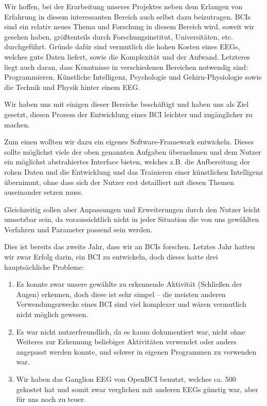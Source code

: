 \documentclass[10pt]{article}
\begin{document}
	
Wir hoffen, bei der Erarbeitung unseres Projektes neben dem Erlangen von Erfahrung in diesem interessanten Bereich auch selbst dazu beizutragen.
BCIs sind ein relativ neues Thema und Forschung in diesem Bereich wird, soweit wir gesehen haben, größtenteils durch Forschungsinstitut, Universitäten, etc. durchgeführt.
Gründe dafür sind vermutlich die hohen Kosten eines EEGs, welches gute Daten liefert, sowie die Komplexität und der Aufwand.
Letzteres liegt auch daran, dass Kenntnisse in verschiedenen Bereichen notwendig sind: Programmieren, Künstliche Intelligenz, Psychologie und Gehirn-Physiologie sowie die Technik und Physik hinter einem EEG.

Wir haben uns mit einigen dieser Bereiche beschäftigt und haben uns als Ziel gesetzt, diesen Prozess der Entwicklung eines BCI leichter und zugänglicher zu machen.

Zum einen wollten wir dazu ein eigenes Software-Framework entwickeln. 
Dieses sollte möglichst viele der oben genannten Aufgaben übernehmen und dem Nutzer ein möglichst abstrahiertes Interface bieten, welches z.B. die Aufbereitung der rohen Daten und die Entwicklung und das Trainieren einer künstlichen Intelligenz übernimmt, ohne dass sich der Nutzer erst detailliert mit diesen Themen auseinander setzen muss.

Gleichzeitig sollen aber Anpassungen und Erweiterungen durch den Nutzer leicht umsetzbar sein, da voraussichtlich nicht in jeder Situation die von uns gewählten Verfahren und Parameter passend sein werden.

Dies ist bereits das zweite Jahr, dass wir an BCIs forschen.
Letztes Jahr hatten wir zwar Erfolg darin, ein BCI zu entwickeln, doch dieses hatte drei hauptsächliche Probleme:

\begin{enumerate}
    \item Es konnte zwar unsere gewählte zu erkennende Aktivität (Schließen der Augen) erkennen, doch diese ist sehr simpel -- die meisten anderen Verwendungszwecke eines BCI sind viel komplexer und wären vermutlich nicht möglich gewesen.
    \item Es war nicht nutzerfreundlich, da es kaum dokumentiert war, nicht ohne Weiteres zur Erkennung beliebiger Aktivitäten verwendet oder anders angepasst werden konnte, und schwer in eigenen Programmen zu verwenden war.
    \item Wir haben das Ganglion EEG von OpenBCI benutzt, welches ca. \SI{500}{\eur} gekostet hat und somit zwar verglichen mit anderen EEGs günstig war, aber für uns noch zu teuer.
\end{enumerate}
\end{document}

